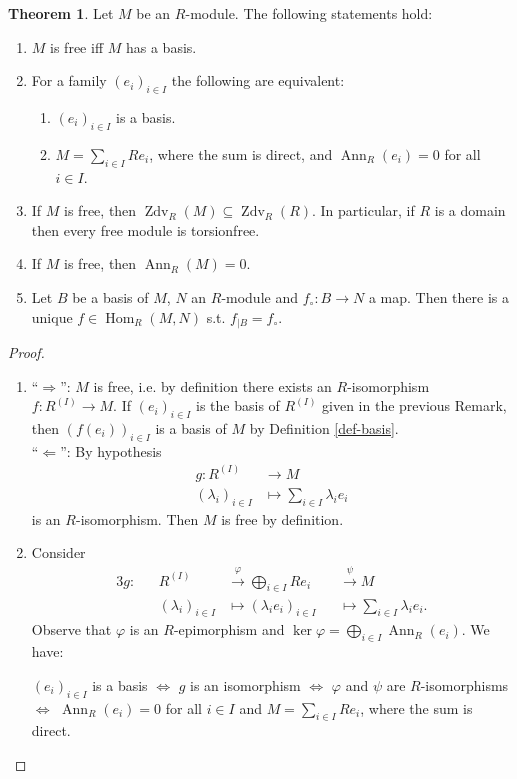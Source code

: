 \documentclass[12pt,a4paper]{report}
\theoremstyle{definition}
\newtheorem{theorem}{Theorem}[chapter] %
\theoremstyle{num.custom-title}
\DeclareMathOperator{\Zdv}{Zdv}
\DeclareMathOperator{\Hom}{Hom}
\DeclareMathOperator{\Ann}{Ann}
\DeclareMathOperator{\imp}{\Rightarrow}
\DeclareMathOperator{\pmi}{\Leftarrow}
\DeclareMathOperator{\sse}{\subseteq}
\renewcommand{\phi}{\varphi}
\renewcommand{\iff}{\Leftrightarrow}
\begin{document}
\begin{theorem}\label{thm-free-mod-prop}
Let $M$ be an $R$-module. The following statements hold:
\begin{enumerate}
\item $M$ is free iff $M$ has a basis.
\item For a family $(e_i)_{i \in I}$ the following are equivalent:
\begin{enumerate}
\item $(e_i)_{i \in I}$ is a basis.
\item $M = \sum_{i \in I} Re_i$, where the sum is direct, and $\Ann_R(e_i)=0$ for all $i \in I$.
\end{enumerate}
\item If $M$ is free, then $\Zdv_R(M) \sse \Zdv_R(R)$. In particular, if $R$ is a domain then every free module is torsionfree.
\item If $M$ is free, then $\Ann_R(M)=0$.
\item Let $B$ be a basis of $M$, $N$ an $R$-module and $f_\circ : B \to N$ a map. Then there is a unique $f \in \Hom_R(M,N)$ s.t. $f_{|B} = f_\circ$.
\end{enumerate}
\begin{proof}\ 
\begin{enumerate}
\item ``$\imp$'': $M$ is free, i.e. by definition there exists an $R$-isomorphism $f: R^{(I)} \to M$. If $(e_i)_{i \in I}$ is the basis of $R^{(I)}$ given in the previous Remark, then $(f(e_i))_{i \in I}$ is a basis of $M$ by Definition \ref{def-basis}.\\
``$\pmi$'': By hypothesis
\begin{align*}
g: R^{(I)} &\to M \\
(\lambda_i)_{i \in I} &\mapsto \sum_{i \in I} \lambda_i e_i
\end{align*}
is an $R$-isomorphism. Then $M$ is free by definition.
\item Consider
\begin{alignat*}{3}
g \colon && R^{(I)} &\stackrel{\phi}{\to} \bigoplus_{i \in I} Re_i &&\stackrel{\psi}{\to} M \\
&& (\lambda_i)_{i \in I} &\mapsto (\lambda_i e_i)_{i \in I} &&\mapsto \sum_{i \in I} \lambda_i e_i .
\end{alignat*}
Observe that $\phi$ is an $R$-epimorphism and $\ker \phi = \bigoplus_{i \in I} \Ann_R(e_i)$. We have:
\begin{center}
$(e_i)_{i \in I}$ is a basis $\iff$ $g$ is an isomorphism $\iff$ $\phi$ and $\psi$ are $R$-isomorphisms $\iff$ $\Ann_R(e_i)=0$ for all $i \in I$ and $M=\sum_{i \in I} Re_i$, where the sum is direct.

\end{center}
\end{enumerate}
\end{proof}
\end{theorem}
\end{document}
